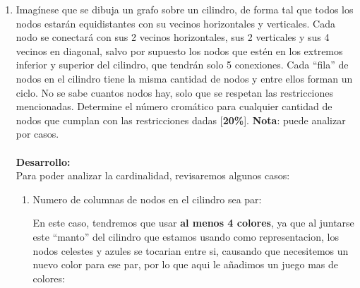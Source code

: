 \documentclass[letterpaper,10pt]{article}
\begin{document}
\begin{enumerate}[1.]
\item Imagínese que se dibuja un grafo sobre un cilindro, de forma tal que todos los nodos estarán equidistantes con su vecinos horizontales y verticales. Cada nodo se conectará con sus 2 vecinos horizontales, sus 2 verticales y sus 4 vecinos en diagonal, salvo por supuesto los nodos que estén en los extremos inferior y superior del cilindro, que tendrán solo 5 conexiones. Cada ``fila'' de nodos en el cilindro tiene la misma cantidad de nodos y entre ellos forman un ciclo. No se sabe cuantos nodos hay, solo que se respetan las restricciones mencionadas. Determine el número cromático para cualquier cantidad de nodos que cumplan con las restricciones dadas [\textbf{20\%}]. \textbf{Nota}: puede analizar por casos. \\ \\
\newline
\textbf{Desarrollo:}\\
\newline
Para poder analizar la cardinalidad, revisaremos algunos casos:
\begin{enumerate}
    \item Numero de columnas de nodos en el cilindro sea par:
    
    En este caso, tendremos que usar \textbf{al menos 4 colores}, ya que al juntarse este ``manto'' del cilindro que estamos usando como representacion, los nodos celestes y azules se tocarian entre si, causando que necesitemos un nuevo color para ese par, por lo que aqui le añadimos un juego mas de colores:



\begin{tikzpicture}[x=0.75pt,y=0.75pt,yscale=-1,xscale=1]


\end{tikzpicture}
\end{enumerate}
\end{enumerate}
\end{document}
